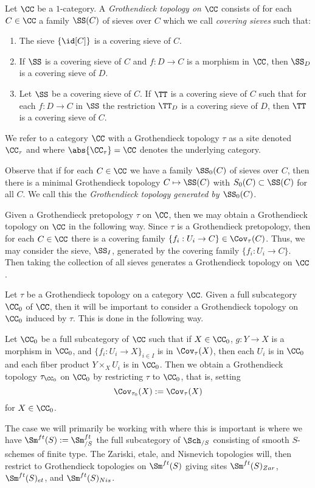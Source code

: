 \documentclass[12pt]{article}
\numberwithin{equation}{section}
\numberwithin{lemma}{section}
\numberwithin{theorem}{section}
\numberwithin{proposition}{section}
\numberwithin{corollary}{section}
\numberwithin{definition}{section}
\numberwithin{example}{section}
\numberwithin{remark}{section}
\begin{document}
\begin{definition}
  Let $\CC$ be a $1$-category. A \emph{Grothendieck topology on $\CC$}
  consists of for each $C \in \CC$ a family $\SS(C)$ of sieves over
  $C$ which we call \emph{covering sieves} such that:
  \begin{enumerate}
  \item The sieve $\{\id[C]\}$ is a covering sieve of $C$.
  \item If $\SS$ is a covering sieve of $C$ and $f : D \to C$ is a
    morphism in $\CC$, then $\SS_{D}$ is a covering sieve of $D$.
  \item Let $\SS$ be a covering sieve of $C$. If $\TT$ is a covering
    sieve of $C$ such that for each $f : D \to C$ in $\SS$ the
    restriction $\TT_D$ is a covering sieve of $D$, then $\TT$ is a
    covering sieve of $C$.
  \end{enumerate}
  We refer to a category $\CC$ with a Grothendieck topology $\tau$ as
  a site denoted $\CC_\tau$ and where $\abs{\CC_{\tau}} = \CC$ denotes
  the underlying category.
\end{definition}

Observe that if for each $C \in \CC$ we have a family $\SS_0(C)$ of
sieves over $C$, then there is a minimal Grothendieck topology
$C \mapsto \SS(C)$ with $S_0(C) \subset \SS(C)$ for all $C$. We call
this the \emph{Grothendieck topology generated by $\SS_0(C)$}.

Given a Grothendieck pretopology $\tau$ on $\CC$, then we may obtain a
Grothendieck topology on $\CC$ in the following way. Since $\tau$ is a
Grothendieck pretopology, then for each $C \in \CC$ there is a
covering family $\{f_i : U_i \to C\} \in \Cov_{\tau}(C)$. Thus, we may
consider the sieve, $\SS_I$, generated by the covering family
$\{f_i : U_i \to C\}$. Then taking the collection of all sieves
generates a Grothendieck topology on $\CC$.

\begin{remark}
  Let $\tau$ be a Grothendieck topology on a category $\CC$. Given a
  full subcategory $\CC_0$ of $\CC$, then it will be important to
  consider a Grothendieck topology on $\CC_0$ induced by $\tau$. This
  is done in the following way.

  Let $\CC_0$ be a full subcategory of $\CC$ such that if
  $X \in \CC_0$, $g : Y \to X$ is a morphism in $\CC_0$, and
  $\{f_i : U_i \to X\}_{i \in I}$ is in $\Cov_{\tau}(X)$, then each
  $U_i$ is in $\CC_0$ and each fiber product $Y \times_X U_i$ is in
  $\CC_0$. Then we obtain a Grothendieck topology $\tau_{\CC_0}$ on
  $\CC_0$ by restricting $\tau$ to $\CC_0$, that is, setting
  \begin{equation*}
    \Cov_{\tau_0}(X) := \Cov_{\tau}(X)
  \end{equation*}
  for $X \in \CC_0$.

  The case we will primarily be working with where this is important
  is where we have $\Sm^{ft}(S) := \Sm^{ft}_{/S}$ the full subcategory
  of $\Sch_{/S}$ consisting of smooth $S$-schemes of finite type. The
  Zariski, etale, and Nisnevich topologies will, then restrict to
  Grothendieck topologies on $\Sm^{ft}(S)$ giving sites
  $\Sm^{ft}(S)_{Zar}$, $\Sm^{ft}(S)_{et}$, and $\Sm^{ft}(S)_{Nis}$.
\end{remark}
\end{document}
